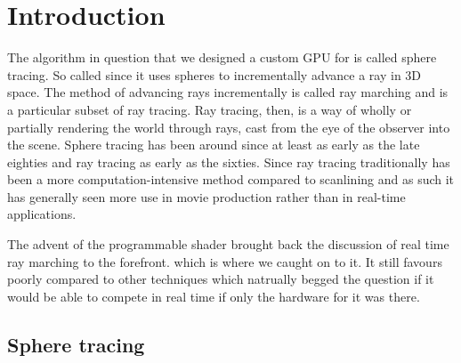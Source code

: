 \chapter{Introduction} 

The algorithm in question that we designed a custom GPU for is called sphere
tracing.\cite{Hart1996} So called since it uses spheres to incrementally
advance a ray in 3D space. The method of advancing rays incrementally is called
ray marching and is a particular subset of ray tracing.\cite{Whitted1980} Ray
tracing, then, is a way of wholly or partially rendering the world through
rays, cast from the eye of the observer into the scene.  Sphere tracing has
been around since at least as early as the late eighties and ray tracing as
early as the sixties.\cite{Hart1989,Appel1968} Since ray tracing traditionally
has been a more computation-intensive method compared to
scanlining\cite{Wylie1967} and as such it has generally seen more use in movie
production rather than in real-time applications.\cite{ref_needed?} 


The advent of the programmable shader brought back the discussion of real time
ray marching to the forefront. which is where we caught on to it.
\cite{JamieWong2016} It still favours poorly compared to other techniques which
natrually begged the question if it would be able to compete in real time if
only the hardware for it was there.

\section{Sphere tracing} 

